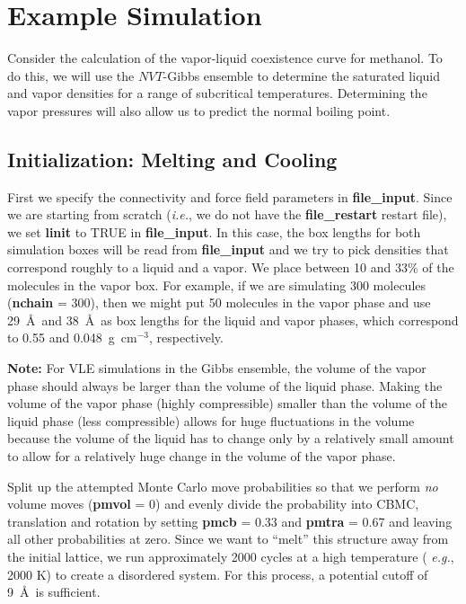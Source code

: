 \documentclass[12pt,letterpaper]{article}
\begin{document}
\section{Example Simulation}
Consider the calculation of the vapor-liquid coexistence
curve for methanol. To do this, we will use the $NVT$-Gibbs
ensemble to determine the saturated liquid and vapor
densities for a range of subcritical temperatures.
Determining the vapor pressures will also allow us to
predict the normal boiling point.

\subsection{Initialization: Melting and Cooling}
First we specify the connectivity and force field parameters
in {\bf file\_input}. Since we are starting from scratch
({\it i.e.}, we do not have the {\bf file\_restart} restart
file), we set {\bf linit} to TRUE in {\bf file\_input}. In
this case, the box lengths for both simulation boxes will be
read from {\bf file\_input} and we try to pick densities
that correspond roughly to a liquid and a vapor. We place
between 10 and 33\% of the molecules in the vapor box. For
example, if we are simulating 300 molecules ({\bf nchain} =
300), then we might put 50 molecules in the vapor phase and
use 29~\AA~and 38~\AA~as box lengths for the liquid and
vapor phases, which correspond to 0.55 and
0.048~g~cm$^{-3}$, respectively.

{\bf Note:} For VLE simulations in the Gibbs ensemble, the
volume of the vapor phase should always be larger than the
volume of the liquid phase. Making the volume of the vapor
phase (highly compressible) smaller than the volume of the
liquid phase (less compressible) allows for huge
fluctuations in the volume because the volume of the liquid
has to change only by a relatively small amount to allow for
a relatively huge change in the volume of the vapor phase.

Split up the attempted Monte Carlo move probabilities so
that we perform {\sl no} volume moves ({\bf pmvol} = 0) and
evenly divide the probability into CBMC, translation and
rotation by setting {\bf pmcb} = 0.33 and {\bf pmtra} = 0.67
and leaving all other probabilities at zero. Since we want
to ``melt'' this structure away from the initial lattice, we
run approximately 2000 cycles at a high temperature ({\it
  e.g.}, 2000 K) to create a disordered system. For this
process, a potential cutoff of 9~\AA~is sufficient.
\end{document}
